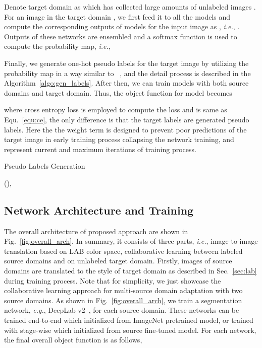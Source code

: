 \documentclass[final]{cvpr}
\def\ie{\textit{i.e.}}
\def\eg{\textit{e.g.}}
\begin{document}
Denote target domain as  which has collected large amounts of unlabeled images . For an image  in the target domain , we first feed it to all the  models  and compute the corresponding outputs of models  for the input image  as , \ie, . Outputs of these networks are ensembled and a softmax function  is used to compute the probability map, \ie,

Finally, we generate one-hot pseudo labels  for the target image  by utilizing the probability map in a way similar to ~\cite{li2019bidirectional,zou2018unsupervised}, and the detail process is described in the Algorithm~\ref{algo:gen_labels}. After then, we can train models  with both source domains and target domain. Thus, the object function for model  becomes

where cross entropy loss is employed to compute the loss  and is same as Equ.~\ref{equ:ce}, the only difference is that the target labels are generated pseudo labels.
Here the the weight term  is designed to prevent poor predictions of the target image in early training process collapsing the network training,  and  represent current and maximum iterations of training process.



\begin{algorithm}[t]
	\caption{Pseudo Labels Generation}
	\label{algo:gen_labels}
	  (), \\
\vspace{-1.6mm}
\end{algorithm}



\subsection{Network Architecture and Training}
The overall architecture of proposed approach are shown in Fig.~\ref{fig:overall_arch}. In summary, it consists of three parts, \ie, image-to-image translation based on LAB color space, collaborative learning between labeled source domains and on unlabeled target domain. Firstly, images of source domains are translated to the style of target domain as described in Sec.~\ref{sec:lab} during training process. Note that for simplicity, we just showcase the collaborative learning approach for multi-source domain adaptation with two source domains. As shown in Fig.~\ref{fig:overall_arch}, we train a segmentation network, \eg, DeepLab v2~\cite{chen2017deeplab}, for each source domain. These networks can be trained end-to-end which initialized from ImageNet pretrained model, or trained with stage-wise which initialized from source fine-tuned model. For each network, the final overall object function is as follows,
\end{document}
